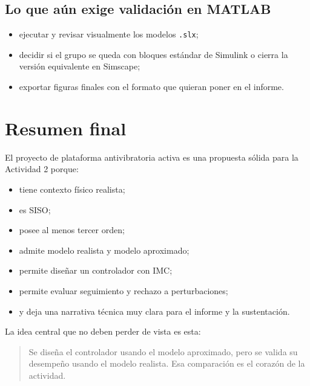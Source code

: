 \documentclass[11pt]{article}
\begin{document}
\subsection{Lo que a\'un exige validaci\'on en MATLAB}

\begin{itemize}[leftmargin=1.2cm]
\item ejecutar y revisar visualmente los modelos \texttt{.slx};
\item decidir si el grupo se queda con bloques est\'andar de Simulink o cierra la versi\'on equivalente en Simscape;
\item exportar figuras finales con el formato que quieran poner en el informe.
\end{itemize}

\section{Resumen final}

El proyecto de plataforma antivibratoria activa es una propuesta s\'olida para la Actividad 2 porque:

\begin{itemize}[leftmargin=1.2cm]
\item tiene contexto f\'isico realista;
\item es SISO;
\item posee al menos tercer orden;
\item admite modelo realista y modelo aproximado;
\item permite dise\~nar un controlador con IMC;
\item permite evaluar seguimiento y rechazo a perturbaciones;
\item y deja una narrativa t\'ecnica muy clara para el informe y la sustentaci\'on.
\end{itemize}

La idea central que no deben perder de vista es esta:

\begin{quote}
Se dise\~na el controlador usando el modelo aproximado, pero se valida su desempe\~no usando el modelo realista. Esa comparaci\'on es el coraz\'on de la actividad.
\end{quote}
\end{document}
